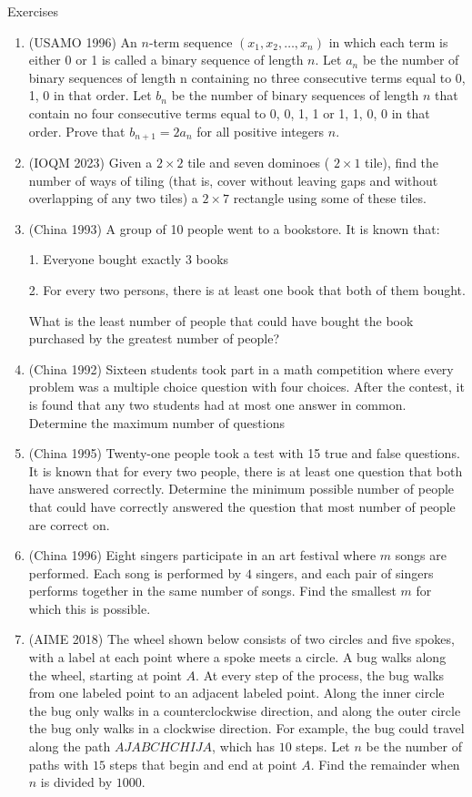 \begin{xcb}{Exercises}
\begin{enumerate}
\item (USAMO 1996) An $n$-term sequence $(x_1, x_2, \ldots, x_n)$ in which each term is either 0 or 1 is called a binary sequence of length $n$. Let $a_n$ be the number of binary sequences of length n containing no three consecutive terms equal to 0, 1, 0 in that order. Let $b_n$ be the number of binary sequences of length $n$ that contain no four consecutive terms equal to 0, 0, 1, 1 or 1, 1, 0, 0 in that order. Prove that $b_{n+1} = 2a_n$ for all positive integers $n$.
\item (IOQM 2023) Given a $2 \times 2$ tile and seven dominoes ( $2 \times 1$ tile), find the number of ways of tiling (that is, cover without leaving gaps and without overlapping of any two tiles) a $2 \times 7$ rectangle using some of these tiles.
\item (China 1993) A group of 10 people went to a bookstore. It is known that:\par
1. Everyone bought exactly 3 books\par
2. For every two persons, there is at least one book that both of them bought.\par
What is the least number of people that could have bought the book purchased by the greatest number of people?\par
\item (China 1992) Sixteen students took part in a math competition where every problem was a multiple choice question with four choices. After the contest, it is found that any two students had at most one answer in common. Determine the maximum number of questions
\item  (China 1995) Twenty-one people took a test with 15 true and false questions. It is known that for every two people, there is at least one question that both have answered correctly. Determine the minimum possible number of people that could have correctly answered the question that most number of people are correct on.
\item (China 1996) Eight singers participate in an art festival where $m$ songs are performed. Each song is performed by $4$ singers, and each pair of singers performs together in the same number of songs. Find the smallest $m$ for which this is possible.
\item (AIME 2018) The wheel shown below consists of two circles and five spokes, with a label at each point where a spoke meets a circle. A bug walks along the wheel, starting at point $A$. At every step of the process, the bug walks from one labeled point to an adjacent labeled point. Along the inner circle the bug only walks in a counterclockwise direction, and along the outer circle the bug only walks in a clockwise direction. For example, the bug could travel along the path $AJABCHCHIJA$, which has $10$ steps. Let $n$ be the number of paths with $15$ steps that begin and end at point $A$. Find the remainder when $n$ is divided by $1000.$

\end{enumerate}
\end{xcb}
